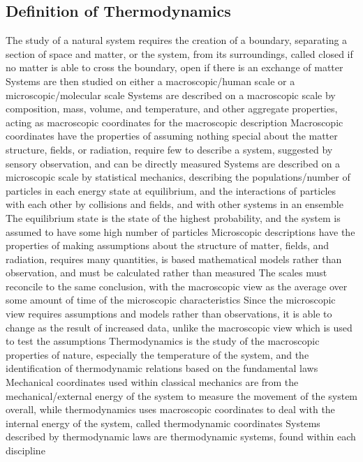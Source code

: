 \documentclass[11 pt, twoside]{article}
\newenvironment{outline*}
{
	\begin{outline}[enumerate]
	}
	{\end{outline}
}
\begin{document}
\subsection{Definition of Thermodynamics}
\begin{outline*}
\1 The study of a natural system requires the creation of a boundary, separating a section of space and matter, or the system, from its surroundings, called closed if no matter is able to cross the boundary, open if there is an exchange of matter
\1 Systems are then studied on either a macroscopic/human scale or a microscopic/molecular scale
\2 Systems are described on a macroscopic scale by composition, mass, volume, and temperature, and other aggregate properties, acting as macroscopic coordinates for the macroscopic description
\3 Macroscopic coordinates have the properties of assuming nothing special about the matter structure, fields, or radiation, require few to describe a system, suggested by sensory observation, and can be directly measured
\2 Systems are described on a microscopic scale by statistical mechanics, describing the populations/number of particles in each energy state at equilibrium, and the interactions of particles with each other by collisions and fields, and with other systems in an ensemble
\3 The equilibrium state is the state of the highest probability, and the system is assumed to have some high number of particles
\3 Microscopic descriptions have the properties of making assumptions about the structure of matter, fields, and radiation, requires many quantities, is based mathematical models rather than observation, and must be calculated rather than measured
\2 The scales must reconcile to the same conclusion, with the macroscopic view as the average over some amount of time of the microscopic characteristics
\3 Since the microscopic view requires assumptions and models rather than observations, it is able to change as the result of increased data, unlike the macroscopic view which is used to test the assumptions
\1 Thermodynamics is the study of the macroscopic properties of nature, especially the temperature of the system, and the identification of thermodynamic relations based on the fundamental laws
\2 Mechanical coordinates used within classical mechanics are from the mechanical/external energy of the system to measure the movement of the system overall, while thermodynamics uses macroscopic coordinates to deal with the internal energy of the system, called thermodynamic coordinates
\2 Systems described by thermodynamic laws are thermodynamic systems, found within each discipline
\end{outline*}
\end{document}

